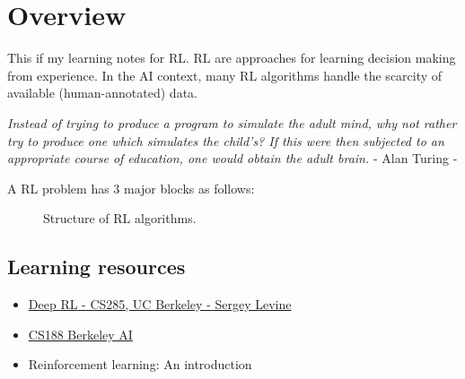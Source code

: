 \chapter{Overview}
This if my learning notes for \ac{RL}. \ac{RL} are approaches for learning decision making from experience. In the \ac{AI} context, many \ac{RL} algorithms handle the scarcity of available (human-annotated) data.

\begin{displayquote}
	\textit{Instead of trying to produce a program to simulate the adult mind, why not rather try to produce one which simulates the child's? If this were then subjected to an appropriate course of education, one would obtain the adult brain.} - Alan Turing -
\end{displayquote}

A \ac{RL} problem has 3 major blocks as follows:
\begin{figure}[hbt!]
	\centering
	\caption{Structure of \ac{RL} algorithms.}
	\label{fig:RL-structure}
\end{figure}

\section{Learning resources}
\begin{itemize}
	\item \href{http://rail.eecs.berkeley.edu/deeprlcourse/}{Deep \ac{RL} - CS285, UC Berkeley - Sergey Levine}
	\item \href{http://ai.berkeley.edu/lecture_videos.fhtml}{CS188 Berkeley AI}
	\item Reinforcement learning: An introduction \cite{sutton2018reinforcement}
\end{itemize}

